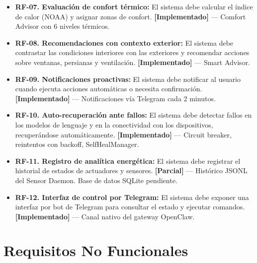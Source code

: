\begin{itemize}
    \item \textbf{RF-07. Evaluación de confort térmico:} El sistema debe calcular el índice de calor (NOAA) y asignar zonas de confort. \textbf{[Implementado]} --- Comfort Advisor con 6 niveles térmicos.

    \item \textbf{RF-08. Recomendaciones con contexto exterior:} El sistema debe contrastar las condiciones interiores con las exteriores y recomendar acciones sobre ventanas, persianas y ventilación. \textbf{[Implementado]} --- Smart Advisor.

    \item \textbf{RF-09. Notificaciones proactivas:} El sistema debe notificar al usuario cuando ejecuta acciones automáticas o necesita confirmación. \textbf{[Implementado]} --- Notificaciones vía Telegram cada 2 minutos.

    \item \textbf{RF-10. Auto-recuperación ante fallos:} El sistema debe detectar fallos en los modelos de lenguaje y en la conectividad con los dispositivos, recuperándose automáticamente. \textbf{[Implementado]} --- Circuit breaker, reintentos con backoff, SelfHealManager.

    \item \textbf{RF-11. Registro de analítica energética:} El sistema debe registrar el historial de estados de actuadores y sensores. \textbf{[Parcial]} --- Histórico JSONL del Sensor Daemon. Base de datos SQLite pendiente.

    \item \textbf{RF-12. Interfaz de control por Telegram:} El sistema debe exponer una interfaz por bot de Telegram para consultar el estado y ejecutar comandos. \textbf{[Implementado]} --- Canal nativo del gateway OpenClaw.
\end{itemize}

\section{Requisitos No Funcionales}

